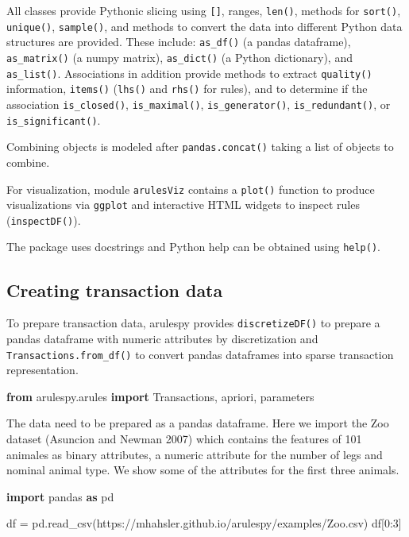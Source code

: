 \documentclass{article}
\newenvironment{Shaded}{}{}
\newcommand{\DecValTok}[1]{\textcolor[rgb]{0.25,0.63,0.44}{#1}}
\newcommand{\ImportTok}[1]{\textcolor[rgb]{0.00,0.50,0.00}{\textbf{#1}}}
\newcommand{\NormalTok}[1]{#1}
\newcommand{\OperatorTok}[1]{\textcolor[rgb]{0.40,0.40,0.40}{#1}}
\newcommand{\StringTok}[1]{\textcolor[rgb]{0.25,0.44,0.63}{#1}}
\begin{document}
All classes provide Pythonic slicing using \texttt{{[}{]}}, ranges,
\texttt{len()}, methods for \texttt{sort()}, \texttt{unique()},
\texttt{sample()}, and methods to convert the data into different Python
data structures are provided. These include: \texttt{as\_df()} (a pandas
dataframe), \texttt{as\_matrix()} (a numpy matrix), \texttt{as\_dict()}
(a Python dictionary), and \texttt{as\_list()}. Associations in addition
provide methods to extract \texttt{quality()} information,
\texttt{items()} (\texttt{lhs()} and \texttt{rhs()} for rules), and to
determine if the association \texttt{is\_closed()},
\texttt{is\_maximal()}, \texttt{is\_generator()},
\texttt{is\_redundant()}, or \texttt{is\_significant()}.

Combining objects is modeled after \texttt{pandas.concat()} taking a
list of objects to combine.

For visualization, module \texttt{arulesViz} contains a \texttt{plot()}
function to produce visualizations via \texttt{ggplot} and interactive
HTML widgets to inspect rules (\texttt{inspectDF()}).

The package uses docstrings and Python help can be obtained using
\texttt{help()}.

\hypertarget{creating-transaction-data}{%
\subsection{Creating transaction data}\label{creating-transaction-data}}

To prepare transaction data, arulespy provides \texttt{discretizeDF()}
to prepare a pandas dataframe with numeric attributes by discretization
and \texttt{Transactions.from\_df()} to convert pandas dataframes into
sparse transaction representation.

\begin{Shaded}
\begin{Highlighting}[]
\ImportTok{from}\NormalTok{ arulespy.arules }\ImportTok{import}\NormalTok{ Transactions, apriori, parameters}
\end{Highlighting}
\end{Shaded}

The data need to be prepared as a pandas dataframe. Here we import the
Zoo dataset (Asuncion and Newman 2007) which contains the features of
101 animales as binary attributes, a numeric attribute for the number of
legs and nominal animal type. We show some of the attributes for the
first three animals.

\begin{Shaded}
\begin{Highlighting}[]
\ImportTok{import}\NormalTok{ pandas }\ImportTok{as}\NormalTok{ pd}

\NormalTok{df }\OperatorTok{=}\NormalTok{ pd.read\_csv(}\StringTok{\textquotesingle{}https://mhahsler.github.io/arulespy/examples/Zoo.csv\textquotesingle{}}\NormalTok{)}
\NormalTok{df[}\DecValTok{0}\NormalTok{:}\DecValTok{3}\NormalTok{]}
\end{Highlighting}
\end{Shaded}
\end{document}
